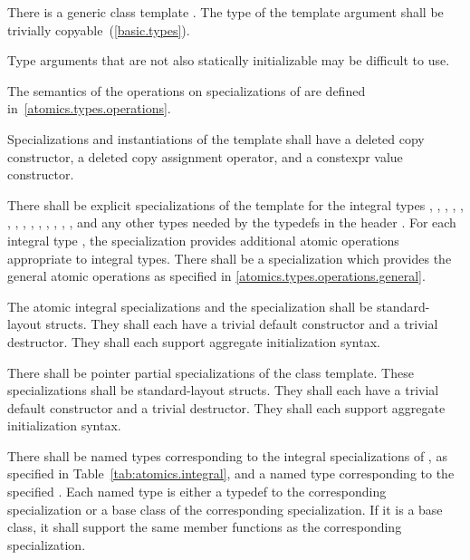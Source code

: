 %
\pnum
There is a generic class template . The type of the template argument
 shall be trivially copyable~(\ref{basic.types}). \begin{note} Type arguments that are
not also statically initializable may be difficult to use. \end{note}

\pnum
The semantics of the operations on specializations of  are defined
in~\ref{atomics.types.operations}.

\pnum
Specializations and instantiations of the  template shall have a deleted copy constructor, a deleted
copy assignment operator, and a constexpr value constructor.

%
\pnum
There shall be explicit specializations of the 
template for the integral types
,
,
,
,
,
,
,
,
,
,
,
,
,
,
and any other types needed by the typedefs in the header .
For each integral type , the specialization
 provides additional atomic operations appropriate to integral types.
There shall be a specialization  which provides the general
atomic operations as specified in \ref{atomics.types.operations.general}.

\pnum
The atomic integral specializations and the specialization 
shall be standard-layout structs. They shall each have a trivial default constructor
and a trivial destructor. They shall each support aggregate initialization
syntax.

%
\pnum
There shall be pointer partial specializations of the  class template.
These specializations shall be standard-layout structs.
They shall each have a trivial default constructor and a trivial destructor.
They shall each support aggregate initialization syntax.

%
\pnum
There shall be named types corresponding to the integral specializations of
, as specified in Table~\ref{tab:atomics.integral}, and a named type
 corresponding to the specified . Each named
type is either a typedef to the corresponding specialization or a base class of the
corresponding specialization. If it is a base class, it shall support the same
member functions as the corresponding specialization.

